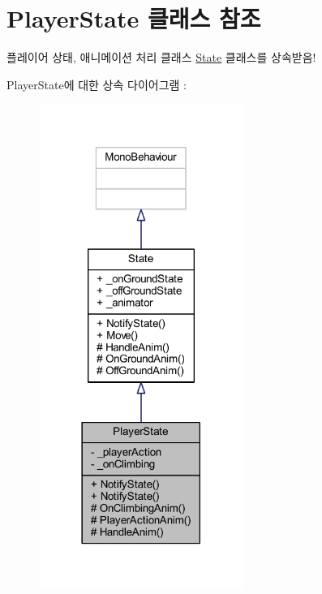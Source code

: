 \hypertarget{class_player_state}{}\section{Player\+State 클래스 참조}
\label{class_player_state}


플레이어 상태, 애니메이션 처리 클래스 \mbox{\hyperlink{class_state}{State}} 클래스를 상속받음!  




Player\+State에 대한 상속 다이어그램 \+: \nopagebreak
\begin{figure}[H]
\begin{center}
\leavevmode
\includegraphics[width=189pt]{d1/dd1/class_player_state__inherit__graph}
\end{center}
\end{figure}


